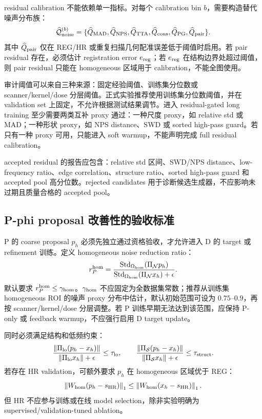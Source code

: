 \documentclass[11pt,a4paper,UTF8,fontset=fandol]{ctexart}
\theoremstyle{definition}
\DeclareMathOperator{\Std}{Std}
\newcommand{\norm}[1]{\left\lVert#1\right\rVert}
\begin{document}
residual calibration 不能依赖单一指标。对每个 calibration bin $b$，需要构造替代噪声分布族：
\begin{equation}
    \widehat{\mathcal Q}_{\rm noise}^{(b)}
    =\{\widehat Q_{\rm MAD},\widehat Q_{\rm NPS},\widehat Q_{\rm TTA},
    \widehat Q_{\rm cons},\widehat Q_{\rm PG},\widehat Q_{\rm pair}\} .
\end{equation}
其中 $\widehat Q_{\rm pair}$ 仅在 REG/HR 或重复扫描几何配准误差低于阈值时启用。若 pair residual 存在，必须估计 registration error $e_{\rm reg}$；若 $e_{\rm reg}$ 在结构边界处超过阈值，则 pair residual 只能在 homogeneous 区域用于 calibration，不能全图使用。

审计阈值可以来自三种来源：固定经验阈值、训练集分位数或 scanner/kernel/dose 分层阈值。正式实验推荐使用训练集分位数阈值，并在 validation set 上固定，不允许根据测试结果调节。进入 residual-gated long training 至少需要两类互补 proxy 通过：一种尺度 proxy，如 relative std 或 MAD；一种形状 proxy，如 NPS distance、SWD 或 sorted high-pass guard。若只有一种 proxy 可用，只能进入 soft warmup，不能声明完成 full residual calibration。

accepted residual 的报告应包含：relative std 区间、SWD/NPS distance、low-frequency ratio、edge correlation、structure ratio、sorted high-pass guard 和 accepted pool 高分位数。rejected candidates 用于诊断候选生成器，不应影响未过期且质量合格的 accepted pool。

\subsection{P-phi proposal 改善性的验收标准}
\label{subsec:p-proposal-qualification}

P 的 coarse proposal $p_h$ 必须先独立通过资格验收，才允许进入 D 的 target 或 refinement 训练。定义 homogeneous noise reduction ratio：
\begin{equation}
    r_P^{\rm hom}=
    \frac{\Std_{\Omega_{\rm hom}}(\Pi_{\mathcal N}p_h)}
    {\Std_{\Omega_{\rm hom}}(\Pi_{\mathcal N}x_h)+\epsilon} .
\end{equation}
默认要求 $r_P^{\rm hom}\le \gamma_{\rm hom}$。$\gamma_{\rm hom}$ 不应固定为全数据集常数；推荐从训练集 homogeneous ROI 的噪声 proxy 分布中估计，默认初始范围可设为 $0.75$--$0.9$，再按 scanner/kernel/dose 分层调整。若 P 训练早期无法达到该范围，应保持 P-only 或 feedback warmup，不应强行启用 D target update。

同时必须满足结构和低频约束：
\begin{equation}
    \frac{\norm{\Pi_{\rm lo}(p_h-x_h)}}{\norm{\Pi_{\rm lo}x_h}+\epsilon}\le \tau_{\rm lo},
    \qquad
    \frac{\norm{\Pi_{\mathcal S}(p_h-x_h)}}{\norm{\Pi_{\mathcal S}x_h}+\epsilon}\le \tau_{\rm struct} .
\end{equation}
若存在 HR validation，可额外要求 $p_h$ 在 homogeneous 区域优于 REG：
\begin{equation}
    \norm{W_{\rm hom}(p_h-s_{\rm HR})}_1
    \le
    \norm{W_{\rm hom}(x_h-s_{\rm HR})}_1 .
\end{equation}
但 HR 不应参与训练或在线 model selection，除非实验明确为 supervised/validation-tuned ablation。
\end{document}
